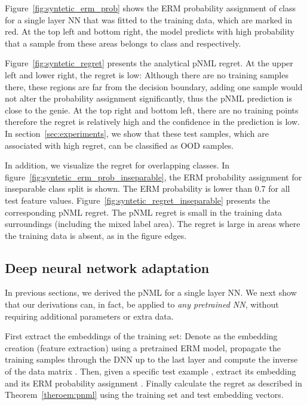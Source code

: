 \documentclass{article}
\def\Theoref#1{Theorem~\ref{#1}}
\def\figref#1{figure~\ref{#1}}
\def\Figref#1{Figure~\ref{#1}}
\def\secref#1{section~\ref{#1}}
\begin{document}
\Figref{fig:syntetic_erm_prob} shows the ERM probability assignment of class  for a single layer NN that was fitted to the training data, which are marked in red.
At the top left and bottom right, the model predicts with high probability that a sample from these areas belongs to class  and  respectively.

\Figref{fig:syntetic_regret} presents the analytical pNML regret. 
At the upper left and lower right, the regret is low: Although there are no training samples there, these regions are far from the decision boundary, adding one sample would not alter the probability assignment significantly, thus the pNML prediction is close to the genie.
At the top right and bottom left, there are no training points therefore the regret is relatively high and the confidence in the prediction is low.
In \secref{sec:experiments}, we show that these test samples, which are associated with high regret, can be classified as OOD samples.

In addition, we visualize the regret for overlapping classes.
In \figref{fig:syntetic_erm_prob_inseparable}, the ERM probability assignment for inseparable class split is shown.
The ERM probability is lower than 0.7 for all test feature values. \Figref{fig:syntetic_regret_inseparable} presents the corresponding pNML regret. The pNML regret is small in the training data surroundings (including the mixed label area). The regret is large in areas where the training data is absent, as in the figure edges.



\subsection{Deep neural network adaptation}
\label{sec:dnn_adaptation}
In previous sections, we derived the pNML for a single layer NN. 
We next show that our derivations can, in fact, be applied to {\em any pretrained NN}, without requiring additional parameters or extra data. 

First extract the embeddings of the training set:
Denote  as the embedding creation (feature extraction) using a pretrained ERM model, propagate the training samples through the DNN up to the last layer and compute the inverse of the data matrix .
Then, given a specific test example , extract its embedding  and its ERM probability assignment .
Finally calculate the regret as described in \Theoref{theroem:pnml} using the training set and test embedding vectors.
\end{document}
